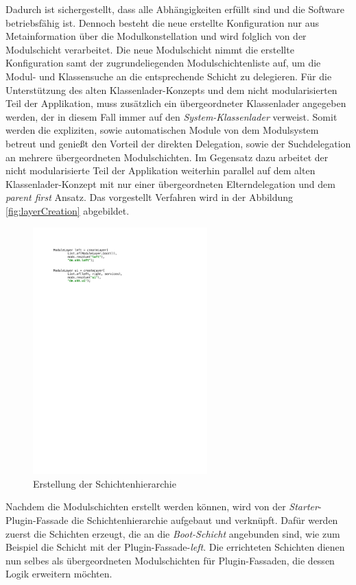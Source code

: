 	Dadurch ist sichergestellt, dass alle Abhängigkeiten erfüllt sind und die Software betriebsfähig ist. Dennoch besteht die neue erstellte Konfiguration nur aus Metainformation über die Modulkonstellation und wird folglich von der Modulschicht verarbeitet. Die neue Modulschicht nimmt die erstellte Konfiguration samt der zugrundeliegenden Modulschichtenliste auf, um die Modul- und Klassensuche an die entsprechende Schicht zu delegieren. Für die Unterstützung des alten Klassenlader-Konzepts und dem nicht modularisierten Teil der Applikation, muss zusätzlich ein übergeordneter Klassenlader angegeben werden, der in diesem Fall immer auf den \textit{System-Klassenlader} verweist. Somit werden die expliziten, sowie automatischen Module von dem Modulsystem betreut und genießt den Vorteil der direkten Delegation, sowie der Suchdelegation an mehrere übergeordneten Modulschichten. Im Gegensatz dazu arbeitet der nicht modularisierte Teil der Applikation weiterhin parallel auf dem alten Klassenlader-Konzept mit nur einer übergeordneten Elterndelegation und dem \textit{parent first} Ansatz. Das vorgestellt Verfahren wird in der Abbildung \ref{fig:layerCreation} abgebildet.\bigbreak
	\begin{figure}[h!]
		   \centering
		   \captionsetup{justification=centering}
		   \includegraphics[width=0.6\textwidth]{material/images/umsetzung/left.pdf}
		   \caption{Erstellung der Schichtenhierarchie}
		   \label{fig:createlayer}
	\end{figure}
	Nachdem die Modulschichten erstellt werden können, wird von der \textit{Starter}-Plugin-Fassade die Schichtenhierarchie aufgebaut und verknüpft. Dafür werden zuerst die Schichten erzeugt, die an die \textit{Boot-Schicht} angebunden sind, wie zum Beispiel die Schicht mit der Plugin-Fassade-\textit{left}. Die errichteten Schichten dienen nun selbes als übergeordneten Modulschichten für Plugin-Fassaden, die dessen Logik erweitern möchten. \newline
